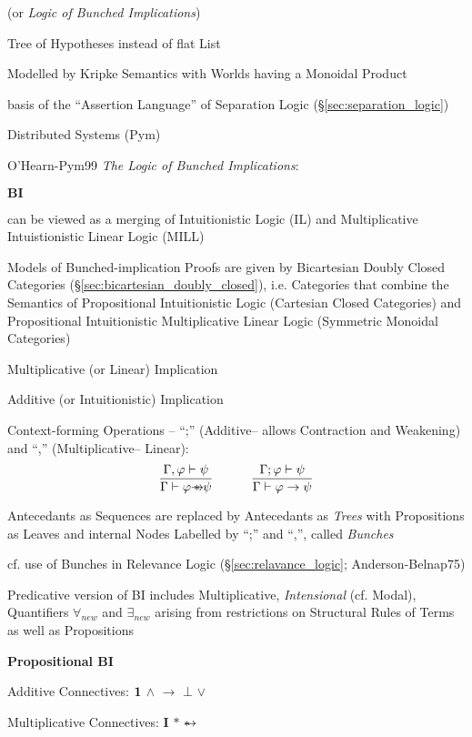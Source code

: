 \begingroup

\newcommand{\implmult}{\mathrlap{\rightarrow}*}
\renewcommand{\Id}{\mathbf{I}}

(or \emph{Logic of Bunched Implications})

Tree of Hypotheses instead of flat List

Modelled by Kripke Semantics with Worlds having a Monoidal Product

basis of the ``Assertion Language'' of Separation Logic
(\S\ref{sec:separation_logic})

Distributed Systems (Pym)

O'Hearn-Pym99 \emph{The Logic of Bunched Implications}:

$\textbf{BI}$

can be viewed as a merging of Intuitionistic Logic (IL) and
Multiplicative Intuistionistic Linear Logic (MILL)

Models of Bunched-implication Proofs are given by Bicartesian Doubly
Closed Categories (\S\ref{sec:bicartesian_doubly_closed}), i.e.
Categories that combine the Semantics of Propositional Intuitionistic
Logic (Cartesian Closed Categories) and Propositional Intuitionistic
Multiplicative Linear Logic (Symmetric Monoidal Categories)

Multiplicative (or Linear) Implication

Additive (or Intuitionistic) Implication

Context-forming Operations -- ``;'' (Additive-- allows Contraction and
Weakening) and ``,'' (Multiplicative-- Linear):
\[
  \frac{\Gamma,\varphi \vdash \psi}
    {\Gamma \vdash \varphi \implmult \psi}
  \quad\quad\quad
  \frac{\Gamma;\varphi \vdash \psi}
    {\Gamma \vdash \varphi \rightarrow \psi}
\]

Antecedants as Sequences are replaced by Antecedants as \emph{Trees}
with Propositions as Leaves and internal Nodes Labelled by ``;'' and
``,'', called \emph{Bunches}

cf. use of Bunches in Relevance Logic (\S\ref{sec:relavance_logic};
Anderson-Belnap75)

Predicative version of BI includes Multiplicative, \emph{Intensional}
(cf. Modal), Quantifiers $\forall_{new}$ and $\exists_{new}$ arising
from restrictions on Structural Rules of Terms as well as Propositions


\textbf{Propositional BI}

Additive Connectives: $\mathbf{1}$ $\wedge$ $\rightarrow$ $\bot$ $\vee$

Multiplicative Connectives: $\Id$ $*$ $\implmult$

